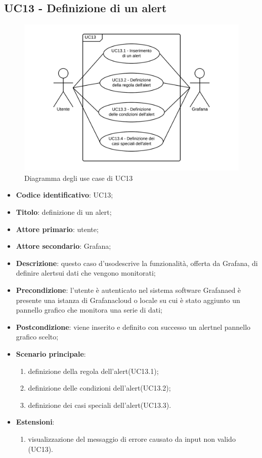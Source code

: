 \subsection{UC13 - Definizione di un alert}
\begin{figure}[H]
\includegraphics{img/UC13_-_Definizione_di_un_alert.png}
\caption{Diagramma degli use case di UC13}
\end{figure}
\begin{itemize}
	\item \textbf{Codice identificativo}: UC13;
	\item \textbf{Titolo}: definizione di un alert\glo;
	\item \textbf{Attore primario}: utente;
	\item \textbf{Attore secondario}: Grafana\glo;
	\item \textbf{Descrizione}: questo caso d'uso\glosp descrive la funzionalità, offerta da Grafana\glo, di definire alert\glosp sui dati che vengono monitorati;
	\item \textbf{Precondizione}: l'utente è autenticato nel sistema software Grafana\glosp ed è presente una istanza di Grafana\glosp cloud o locale su cui è stato aggiunto un pannello grafico che monitora una serie di dati;
	\item \textbf{Postcondizione}: viene inserito e definito con successo un alert\glosp nel pannello grafico scelto;
	\item \textbf{Scenario principale}: 
	\begin{enumerate}
		\item definizione della regola dell'alert\glosp (UC13.1);
		\item definizione delle condizioni dell'alert\glosp (UC13.2);
		\item definizione dei casi speciali dell'alert\glosp (UC13.3).
	\end{enumerate}

	\item \textbf{Estensioni}:	
	\begin{enumerate}
		\item visualizzazione del messaggio di errore causato da input non valido (UC13).
	\end{enumerate}
\end{itemize}

